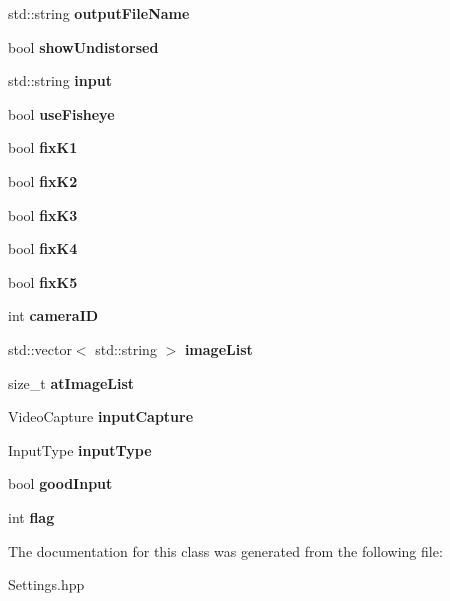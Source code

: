 \begin{DoxyCompactItemize}
std\+::string {\bfseries output\+File\+Name}
\item 
\mbox{\label{class_settings_a935d6f27ee454e9fee63f8b662f48a06}} 
bool {\bfseries show\+Undistorsed}
\item 
\mbox{\label{class_settings_a8696deae231b0efe48f1d069a4145ee6}} 
std\+::string {\bfseries input}
\item 
\mbox{\label{class_settings_ac8f271630d54f9d0c718ea0130972d44}} 
bool {\bfseries use\+Fisheye}
\item 
\mbox{\label{class_settings_a25242813ee2c5e111ce48fe1f7f85e7b}} 
bool {\bfseries fix\+K1}
\item 
\mbox{\label{class_settings_abad0b643dc5a39d493a6343d38f41578}} 
bool {\bfseries fix\+K2}
\item 
\mbox{\label{class_settings_a433fca3c377d42f1c7d43e35a286913f}} 
bool {\bfseries fix\+K3}
\item 
\mbox{\label{class_settings_ac993998a56cebe0593cb74fe39858d31}} 
bool {\bfseries fix\+K4}
\item 
\mbox{\label{class_settings_a4d0d37eef5f3033a8aabc3f09ee29a03}} 
bool {\bfseries fix\+K5}
\item 
\mbox{\label{class_settings_af32a5ff06192bde106c934e0361bcd7e}} 
int {\bfseries camera\+ID}
\item 
\mbox{\label{class_settings_ab3f8f916639b93c3b5079facfe395078}} 
std\+::vector$<$ std\+::string $>$ {\bfseries image\+List}
\item 
\mbox{\label{class_settings_a1b89e85a2638e19f2d53269245d19b66}} 
size\+\_\+t {\bfseries at\+Image\+List}
\item 
\mbox{\label{class_settings_abd5706146b34d3c32aef4025dcd2ec1b}} 
Video\+Capture {\bfseries input\+Capture}
\item 
\mbox{\label{class_settings_a89fb14ce9856fb642f18bb0f7c5b8868}} 
Input\+Type {\bfseries input\+Type}
\item 
\mbox{\label{class_settings_a3b9fc27b555f982bd5b9ea5198e1f7e3}} 
bool {\bfseries good\+Input}
\item 
\mbox{\label{class_settings_aba5691e3e76525f93ea254e654ec3717}} 
int {\bfseries flag}
\end{DoxyCompactItemize}


The documentation for this class was generated from the following file\+:\begin{DoxyCompactItemize}
\item 
Settings.\+hpp\end{DoxyCompactItemize}

